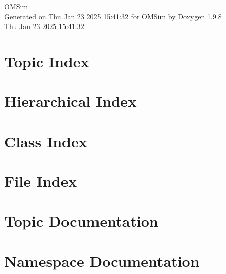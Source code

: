 \documentclass[twoside]{book}
\newcommand{\+}{\discretionary{\mbox{\scriptsize$\hookleftarrow$}}{}{}}
\newcommand{\clearemptydoublepage}{%
    \newpage{\pagestyle{empty}\cleardoublepage}%
  }
\begin{document}
  \raggedbottom
    \hypersetup{pageanchor=false,
                bookmarksnumbered=true,
                pdfencoding=unicode
               }
  \begin{titlepage}
  \vspace*{7cm}
  \begin{center}%
  {\Large OMSim}\\
  \vspace*{1cm}
  {\large Generated on Thu Jan 23 2025 15\+:41\+:32 for OMSim by Doxygen 1.9.8}\\
    \vspace*{0.5cm}
    {\small Thu Jan 23 2025 15:41:32}
  \end{center}
  \end{titlepage}
  \clearemptydoublepage
  \tableofcontents
  \clearemptydoublepage
  \hypersetup{pageanchor=true}








\chapter{Topic Index}

\chapter{Hierarchical Index}

\chapter{Class Index}

\chapter{File Index}

\chapter{Topic Documentation}




\chapter{Namespace Documentation}



\end{document}
